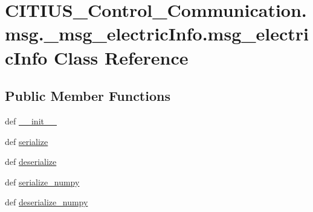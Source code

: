 \hypertarget{class_c_i_t_i_u_s___control___communication_1_1msg_1_1__msg__electric_info_1_1msg__electric_info}{\section{\-C\-I\-T\-I\-U\-S\-\_\-\-Control\-\_\-\-Communication.\-msg.\-\_\-msg\-\_\-electric\-Info.\-msg\-\_\-electric\-Info \-Class \-Reference}
\label{class_c_i_t_i_u_s___control___communication_1_1msg_1_1__msg__electric_info_1_1msg__electric_info}
}
\subsection*{\-Public \-Member \-Functions}
\begin{DoxyCompactItemize}
\item 
def \hyperlink{class_c_i_t_i_u_s___control___communication_1_1msg_1_1__msg__electric_info_1_1msg__electric_info_a286cb37c7de5fe74936328f1c165bca4}{\-\_\-\-\_\-init\-\_\-\-\_\-}
\item 
def \hyperlink{class_c_i_t_i_u_s___control___communication_1_1msg_1_1__msg__electric_info_1_1msg__electric_info_a1738c2e49061f83b5557705f51f2c124}{serialize}
\item 
def \hyperlink{class_c_i_t_i_u_s___control___communication_1_1msg_1_1__msg__electric_info_1_1msg__electric_info_a87283b503bdc49e95e259c7cc645ce39}{deserialize}
\item 
def \hyperlink{class_c_i_t_i_u_s___control___communication_1_1msg_1_1__msg__electric_info_1_1msg__electric_info_ad812198dd270cf830666cb010e96e17e}{serialize\-\_\-numpy}
\item 
def \hyperlink{class_c_i_t_i_u_s___control___communication_1_1msg_1_1__msg__electric_info_1_1msg__electric_info_ae9c1c28deecd839c652b0c28c617e010}{deserialize\-\_\-numpy}
\end{DoxyCompactItemize}
